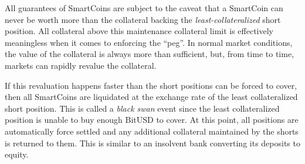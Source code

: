 \label{sec:blackswan}

All guarantees of SmartCoins are subject to the caveat that a SmartCoin can
never be worth more than the collateral backing the \emph{least-collateralized}
short position. All collateral above this maintenance collateral limit is
effectively meaningless when it comes to enforcing the ``peg''. In normal
market conditions, the value of the collateral is always more than sufficient,
but, from time to time, markets can rapidly revalue the collateral.

If this revaluation happens faster than the short positions can be forced to
cover, then all SmartCoins are liquidated at the exchange rate of the least
collateralized short position. This is called a \emph{black swan} event since
the least collateralized position is unable to buy enough BitUSD to cover. At
this point, all positions are automatically force settled and any additional
collateral maintained by the shorts is returned to them. This is similar to an
insolvent bank converting its deposits to equity.
